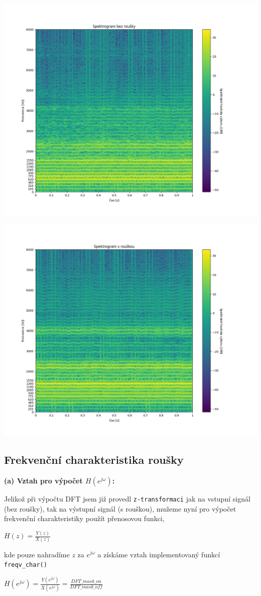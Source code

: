 \documentclass[12pt]{article}
\begin{document}
\hspace{-0.7cm}\includegraphics[scale=0.65]{nomask_spec.png}

\hspace{-0.7cm}\includegraphics[scale=0.65]{mask_spec.png}
\subsection{Frekvenční charakteristika roušky}
\textbf{(a) Vztah pro výpočet $H(e^{j \omega})$:}

\hspace{1.5em} Jelikož při výpočtu DFT jsem již provedl \texttt{z-transformaci} jak na vstupní signál (bez roušky), tak na výstupní signál (s rouškou), mužeme nyní pro výpočet frekvenční charakteristiky použít přenosovou funkci,
\begin{center}
$H(z)= \frac{Y(z)}{X(z)}$
\end{center}
kde pouze nahradíme $z$ za $e^{j \omega}$ a získáme vztah implementovaný funkcí \texttt{freqv\_char()}
\begin{center}
$H(e^{j \omega})= \frac{Y(e^{j \omega})}{X(e^{j \omega})}=\frac{DFT\_mask\_on}{DFT\_mask\_off}$
\end{center}
\end{document}
